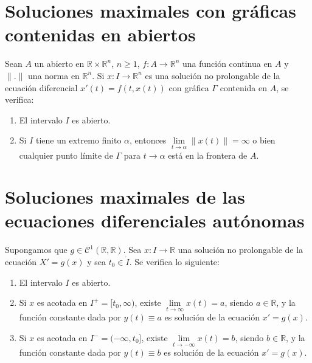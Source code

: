 \section{Soluciones maximales con gráficas contenidas en abiertos}
\begin{theorem}
    Sean $A$ un abierto en $\mathbb{R} \times \mathbb{R}^n$, $n \geq 1$, $f: A \to \mathbb{R}^n$ una función continua en $A$ y $\|.\|$ una norma en $\mathbb{R}^n$.
    Si $x: I \to \mathbb{R}^n$ es una solución no prolongable de la ecuación diferencial $x'(t) = f(t, x(t))$ con gráfica $\Gamma$ contenida en $A$, se verifica:
    \begin{enumerate}
        \item El intervalo $I$ es abierto.
        \item Si $I$ tiene un extremo finito $\alpha$, entonces $\lim\limits_{t \to \alpha} \|x(t)\| = \infty$ o bien cualquier punto límite de $\Gamma$ para $t \to \alpha$ está en la frontera de $A$.
    \end{enumerate}
\end{theorem}

\section{Soluciones maximales de las ecuaciones diferenciales autónomas}
\begin{theorem}
    Supongamos que $g \in \mathcal{C}^1(\mathbb{R}, \mathbb{R})$.
    Sea $x: I \to \mathbb{R}$ una solución no prolongable de la ecuación $X' = g(x)$ y sea $t_0 \in \dot{I}$.
    Se verifica lo siguiente:
    \begin{enumerate}
        \item El intervalo $I$ es abierto.
        \item Si $x$ es acotada en $I^+ = [t_0, \infty)$, existe $\lim\limits_{t \to \infty} x(t) = a$, siendo $a \in \mathbb{R}$, y la función constante dada por $y(t) \equiv a$ es solución de la ecuación $x' = g(x)$.
        \item Si $x$ es acotada en $I^- = (-\infty, t_0]$, existe $\lim\limits_{t \to -\infty} x(t) = b$, siendo $b \in \mathbb{R}$, y la función constante dada por $y(t) \equiv b$ es solución de la ecuación $x' = g(x)$.
    \end{enumerate}
\end{theorem}
